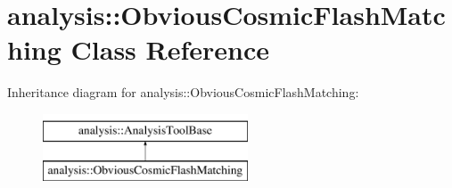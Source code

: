 \hypertarget{classanalysis_1_1ObviousCosmicFlashMatching}{}\section{analysis\+:\+:Obvious\+Cosmic\+Flash\+Matching Class Reference}
\label{classanalysis_1_1ObviousCosmicFlashMatching}
Inheritance diagram for analysis\+:\+:Obvious\+Cosmic\+Flash\+Matching\+:\begin{figure}[H]
\begin{center}
\leavevmode
\includegraphics[height=2.000000cm]{classanalysis_1_1ObviousCosmicFlashMatching}
\end{center}
\end{figure}
